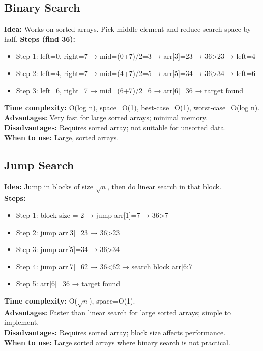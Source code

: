 \documentclass[a4paper,12pt]{article}
\begin{document}
\subsection{Binary Search}
\textbf{Idea:} Works on sorted arrays. Pick middle element and reduce search space by half.  
\textbf{Steps (find 36):}
\begin{itemize}
  \item Step 1: left=0, right=7 → mid=(0+7)/2=3 → arr[3]=23 → 36>23 → left=4
  \item Step 2: left=4, right=7 → mid=(4+7)/2=5 → arr[5]=34 → 36>34 → left=6
  \item Step 3: left=6, right=7 → mid=(6+7)/2=6 → arr[6]=36 → target found
\end{itemize}
\textbf{Time complexity:} O(log n), space=O(1), best-case=O(1), worst-case=O(log n).  \\
\textbf{Advantages:} Very fast for large sorted arrays; minimal memory.\\
\textbf{Disadvantages:} Requires sorted array; not suitable for unsorted data.\\
\textbf{When to use:} Large, sorted arrays.

\subsection{Jump Search}
\textbf{Idea:} Jump in blocks of size $\sqrt{n}$, then do linear search in that block.  \\
\textbf{Steps:}
\begin{itemize}
  \item Step 1: block size = 2 → jump arr[1]=7 → 36>7
  \item Step 2: jump arr[3]=23 → 36>23
  \item Step 3: jump arr[5]=34 → 36>34
  \item Step 4: jump arr[7]=62 → 36<62 → search block arr[6:7]
  \item Step 5: arr[6]=36 → target found
\end{itemize}
\textbf{Time complexity:} O($\sqrt{n}$), space=O(1).\\
\textbf{Advantages:} Faster than linear search for large sorted arrays; simple to implement.\\
\textbf{Disadvantages:} Requires sorted array; block size affects performance.\\
\textbf{When to use:} Large sorted arrays where binary search is not practical.
\end{document}

